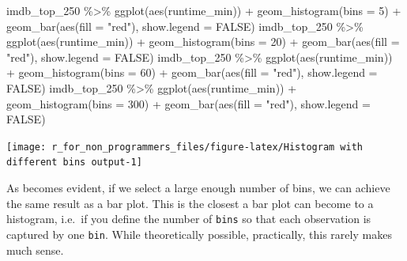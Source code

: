 \documentclass[
]{book}
\newenvironment{Shaded}{\begin{snugshade}}{\end{snugshade}}
\newcommand{\AttributeTok}[1]{\textcolor[rgb]{0.77,0.63,0.00}{#1}}
\newcommand{\ConstantTok}[1]{\textcolor[rgb]{0.00,0.00,0.00}{#1}}
\newcommand{\DecValTok}[1]{\textcolor[rgb]{0.00,0.00,0.81}{#1}}
\newcommand{\FunctionTok}[1]{\textcolor[rgb]{0.00,0.00,0.00}{#1}}
\newcommand{\NormalTok}[1]{#1}
\newcommand{\SpecialCharTok}[1]{\textcolor[rgb]{0.00,0.00,0.00}{#1}}
\newcommand{\StringTok}[1]{\textcolor[rgb]{0.31,0.60,0.02}{#1}}
\begin{document}
\begin{Shaded}
\begin{Highlighting}[]
\NormalTok{imdb\_top\_250 }\SpecialCharTok{\%\textgreater{}\%}
  \FunctionTok{ggplot}\NormalTok{(}\FunctionTok{aes}\NormalTok{(runtime\_min)) }\SpecialCharTok{+}
  \FunctionTok{geom\_histogram}\NormalTok{(}\AttributeTok{bins =} \DecValTok{5}\NormalTok{) }\SpecialCharTok{+}
  \FunctionTok{geom\_bar}\NormalTok{(}\FunctionTok{aes}\NormalTok{(}\AttributeTok{fill =} \StringTok{"red"}\NormalTok{), }\AttributeTok{show.legend =} \ConstantTok{FALSE}\NormalTok{)}
\NormalTok{imdb\_top\_250 }\SpecialCharTok{\%\textgreater{}\%}
  \FunctionTok{ggplot}\NormalTok{(}\FunctionTok{aes}\NormalTok{(runtime\_min)) }\SpecialCharTok{+}
  \FunctionTok{geom\_histogram}\NormalTok{(}\AttributeTok{bins =} \DecValTok{20}\NormalTok{) }\SpecialCharTok{+}
  \FunctionTok{geom\_bar}\NormalTok{(}\FunctionTok{aes}\NormalTok{(}\AttributeTok{fill =} \StringTok{"red"}\NormalTok{), }\AttributeTok{show.legend =} \ConstantTok{FALSE}\NormalTok{)}
\NormalTok{imdb\_top\_250 }\SpecialCharTok{\%\textgreater{}\%}
  \FunctionTok{ggplot}\NormalTok{(}\FunctionTok{aes}\NormalTok{(runtime\_min)) }\SpecialCharTok{+}
  \FunctionTok{geom\_histogram}\NormalTok{(}\AttributeTok{bins =} \DecValTok{60}\NormalTok{) }\SpecialCharTok{+}
  \FunctionTok{geom\_bar}\NormalTok{(}\FunctionTok{aes}\NormalTok{(}\AttributeTok{fill =} \StringTok{"red"}\NormalTok{), }\AttributeTok{show.legend =} \ConstantTok{FALSE}\NormalTok{)}
\NormalTok{imdb\_top\_250 }\SpecialCharTok{\%\textgreater{}\%}
  \FunctionTok{ggplot}\NormalTok{(}\FunctionTok{aes}\NormalTok{(runtime\_min)) }\SpecialCharTok{+}
  \FunctionTok{geom\_histogram}\NormalTok{(}\AttributeTok{bins =} \DecValTok{300}\NormalTok{) }\SpecialCharTok{+}
  \FunctionTok{geom\_bar}\NormalTok{(}\FunctionTok{aes}\NormalTok{(}\AttributeTok{fill =} \StringTok{"red"}\NormalTok{), }\AttributeTok{show.legend =} \ConstantTok{FALSE}\NormalTok{)}
\end{Highlighting}
\end{Shaded}

\begin{center}\texttt{[image: r\_for\_non\_programmers\_files/figure-latex/Histogram with different bins output-1]} \end{center}

As becomes evident, if we select a large enough number of bins, we can achieve the same result as a bar plot. This is the closest a bar plot can become to a histogram, i.e.~if you define the number of \texttt{bins} so that each observation is captured by one \texttt{bin}. While theoretically possible, practically, this rarely makes much sense.
\end{document}
